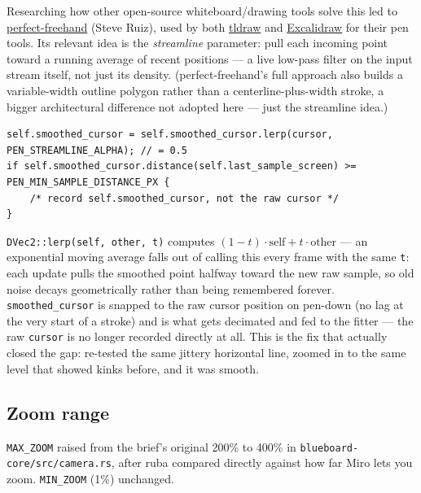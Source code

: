 \documentclass[11pt]{article}
\begin{document}
Researching how other open-source whiteboard/drawing tools solve this led to
\href{https://github.com/steveruizok/perfect-freehand}{perfect-freehand} (Steve Ruiz),
used by both \href{https://tldraw.dev/sdk-features/draw-shape}{tldraw} and
\href{https://github.com/excalidraw/excalidraw/pull/3512}{Excalidraw} for their pen tools.
Its relevant idea is the \emph{streamline} parameter: pull each incoming point toward a
running average of recent positions — a live low-pass filter on the input stream itself,
not just its density. (perfect-freehand's full approach also builds a variable-width
outline polygon rather than a centerline-plus-width stroke, a bigger architectural
difference not adopted here — just the streamline idea.)
\begin{lstlisting}
self.smoothed_cursor = self.smoothed_cursor.lerp(cursor, PEN_STREAMLINE_ALPHA); // = 0.5
if self.smoothed_cursor.distance(self.last_sample_screen) >= PEN_MIN_SAMPLE_DISTANCE_PX {
    /* record self.smoothed_cursor, not the raw cursor */
}
\end{lstlisting}
\texttt{DVec2::lerp(self, other, t)} computes $(1-t)\cdot\text{self} + t\cdot\text{other}$
— an exponential moving average falls out of calling this every frame with the same
\texttt{t}: each update pulls the smoothed point halfway toward the new raw sample,
so old noise decays geometrically rather than being remembered forever.
\texttt{smoothed\_cursor} is snapped to the raw cursor position on pen-down (no lag at the
very start of a stroke) and is what gets decimated and fed to the fitter — the raw
\texttt{cursor} is no longer recorded directly at all. This is the fix that actually
closed the gap: re-tested the same jittery horizontal line, zoomed in to the same level
that showed kinks before, and it was smooth.

\subsection{Zoom range}
\texttt{MAX\_ZOOM} raised from the brief's original 200\% to 400\% in
\texttt{blueboard-core/src/camera.rs}, after ruba compared directly against how far Miro
lets you zoom. \texttt{MIN\_ZOOM} (1\%) unchanged.
\end{document}
